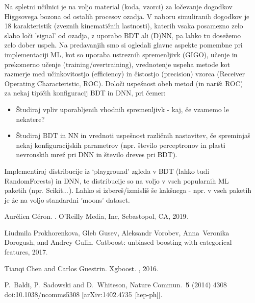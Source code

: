\documentclass[slovene,11pt,a4paper]{article}
\begin{document}
 Na spletni učilnici je na voljo material (koda, vzorci) za 
ločevanje dogodkov Higgsovega bozona od ostalih procesov ozadja. V naboru simuliranih 
dogodkov je 18 karakteristik (zveznih kinematičnih lastnosti), katerih vsaka 
posamezno zelo slabo loči 'signal' od ozadja, z uporabo BDT ali (D)NN, pa lahko tu dosežemo
zelo dober uspeh.  Na predavanjih smo si ogledali glavne aspekte pomembne pri implementaciji ML, 
kot so  uporaba ustreznih spremenljivk (GIGO), učenje in prekomerno učenje (training/overtraining), 
vrednotenje uspeha metode kot razmerje med učinkovitostjo (efficiency) in čistostjo (precision) 
vzorca (Receiver Operating Characteristic, ROC). Določi uspešnost obeh metod (in nariši ROC) 
za nekaj tipičih konfiguracij BDT in DNN, pri čemer:
\begin{itemize}
  \item Študiraj vpliv uporabljenih vhodnih spremenljivk - kaj, če vzamemo le nekatere?
  \item Študiraj BDT in NN in vrednoti uspešnost različnih nastavitev,  če spreminjaš nekaj konfiguracijskih parametrov
  (npr. število perceptronov in plasti nevronskih mrež pri DNN in število dreves pri BDT). 
\end{itemize}


 Implementiraj distribucije iz ‘playground’ zgleda v BDT (lahko tudi RandomForests) in DNN,
te distribucije so na voljo v vseh popularnih ML paketih (npr. Scikit...).
Lahko  si izbereš/izmisliš še kakšnega - npr. v vseh paketih je že na voljo standardni 'moons' dataset.



%

\begin{thebibliography}{1}
 
  
  Aur\'{e}lien G\'{e}ron.
  .
  \newblock O'Reilly Media, Inc, Sebastopol, CA, 2019.
  
  Liudmila Prokhorenkova, Gleb Gusev, Aleksandr Vorobev, Anna~Veronika Dorogush,
    and Andrey Gulin.
  \newblock Catboost: unbiased boosting with categorical features, 2017.

  Tianqi Chen and Carlos Guestrin.
  \newblock Xgboost.
  , 2016.

P.~Baldi, P.~Sadowski and D.~Whiteson,
Nature Commun.\  {\bf 5} (2014) 4308
doi:10.1038/ncomms5308
[arXiv:1402.4735 [hep-ph]].
\end{thebibliography}


\end{document}
